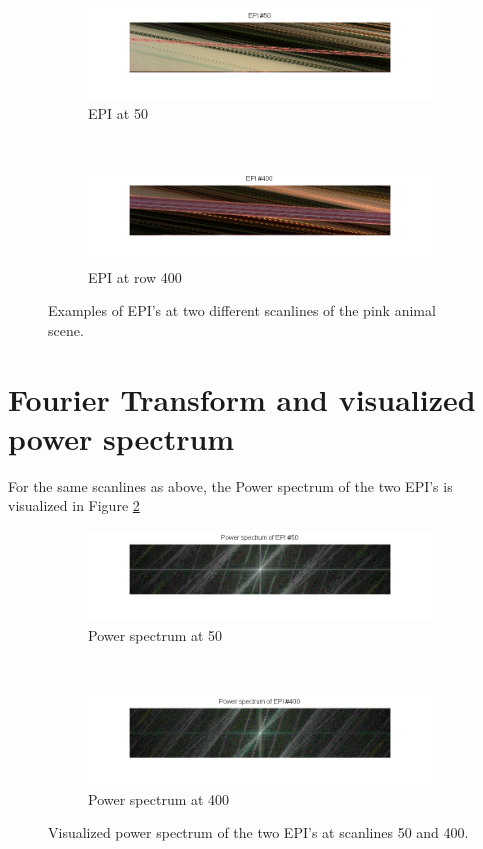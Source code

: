 \documentclass[a4paper]{article}
\begin{document}
\begin{figure}[ht]
	\vspace{2mm}
	\begin{subfigure}[h]{0.48\textwidth}
	  \includegraphics[width=\textwidth]{EPI50}
	  \caption*{EPI at 50}
	\end{subfigure}
    	~
	\begin{subfigure}[h]{0.48\textwidth}
	  \centering
	  \includegraphics[width=\textwidth]{EPI400}
	  \caption*{EPI at row 400}
	\end{subfigure}
\caption{Examples of EPI's at two different scanlines of the pink animal scene.}
\label{fig:EPIs}
\end{figure}
\section*{Fourier Transform and visualized power spectrum}
For the same scanlines as above, the Power spectrum of the two EPI's is visualized in Figure \ref{fig:powerSpectrum}
\begin{figure}[ht]
	\vspace{2mm}
	\begin{subfigure}[h]{0.48\textwidth}
	  \includegraphics[width=\textwidth]{powerSpec50}
	  \caption*{Power spectrum at 50}
	\end{subfigure}
    	~
	\begin{subfigure}[h]{0.48\textwidth}
	  \centering
	  \includegraphics[width=\textwidth]{powerSpec400}
	  \caption*{Power spectrum at 400}
	\end{subfigure}
\caption{Visualized power spectrum of the two EPI's at scanlines 50 and 400.}
\label{fig:powerSpectrum}
\end{figure}
\end{document}
